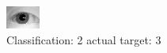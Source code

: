 \begin{figure}[h!]
\begin{center}
\includegraphics[width=0.60\columnwidth]{figures/ID1165_class_2_target_3.png}
\end{center}
\caption{ Classification: 2 actual target: 3}
\label{fig:ID1165_class_2_target_3}
\end{figure}
